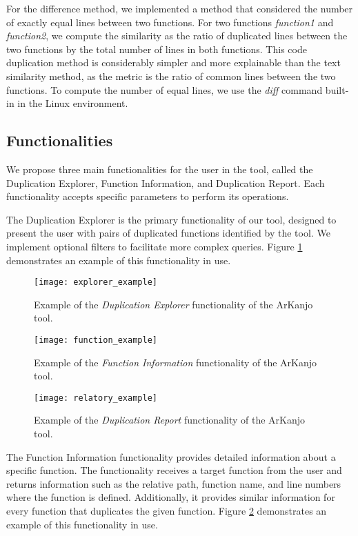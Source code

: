 \documentclass[conference]{IEEEtran}
\begin{document}
For the difference method, 
we implemented a method that considered the number of exactly equal lines between two functions.
For two functions \textit{function1} and \textit{function2}, we compute the similarity as the 
ratio of duplicated lines between the two functions by the total number of lines in both functions.
This code duplication method is considerably simpler and more explainable than the text similarity method, 
as the metric is the ratio of common lines between the two functions. To compute the number of equal lines, we use
the \textit{diff} command built-in in the Linux environment.

\subsection{Functionalities}

We propose three main functionalities for the user in the tool, called the Duplication
Explorer, Function Information, and Duplication Report. Each functionality accepts
specific parameters to perform its operations.

The Duplication Explorer is the primary functionality of our tool, designed to present
the user with pairs of duplicated functions identified by the tool. We implement optional
filters to facilitate more complex queries. Figure \ref{fig:explorer_ex} demonstrates an
example of this functionality in use.

\begin{figure}[!t]
\centering
\texttt{[image: explorer\_example]}
\caption{Example of the \textit{Duplication Explorer} functionality of the ArKanjo tool.}
\label{fig:explorer_ex}
\end{figure}

\begin{figure}[!t]
\centering
\texttt{[image: function\_example]}
\caption{Example of the \textit{Function Information} functionality of the ArKanjo tool.}
\label{fig:function_ex}
\end{figure}

\begin{figure}[!t]
\centering
\texttt{[image: relatory\_example]}
\caption{Example of the \textit{Duplication Report} functionality of the ArKanjo tool.}
\label{fig:relatory_ex}
\end{figure}


The Function Information functionality provides detailed information about a specific function. 
The functionality receives a target function from the user
and returns information such as the relative path, function name, and line numbers where
the function is defined. Additionally, it provides similar information for every function
that duplicates the given function. Figure \ref{fig:function_ex} demonstrates an
example of this functionality in use.
\end{document}

